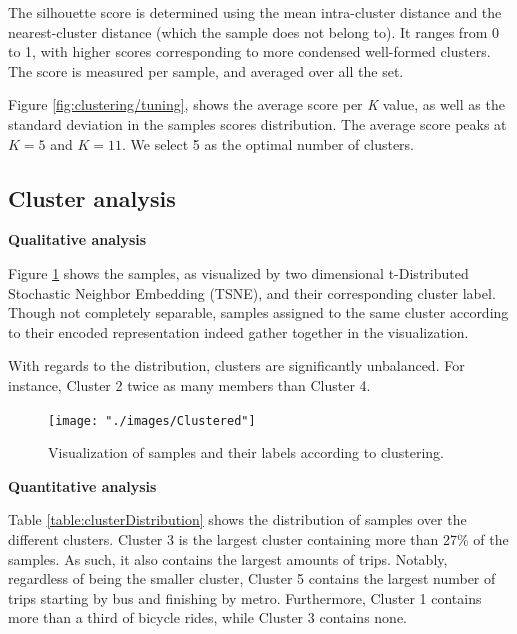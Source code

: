\documentclass{article}
\begin{document}
The silhouette score is determined using the mean intra-cluster distance and the nearest-cluster distance (which the sample does not belong to). It ranges from 0 to 1, with higher scores corresponding to more condensed well-formed clusters. The score is measured per sample, and averaged over all the set. 

Figure \ref{fig:clustering/tuning}, shows the average score per \textit{K} value, as well as the standard deviation in the samples scores distribution. The average score peaks at $\textit{K} = 5 $ and $\textit{K} = 11 $. We select 5 as the optimal number of clusters. 

\subsection{Cluster analysis}

\textbf{Qualitative analysis}


Figure \ref{fig:clustering/tsne} shows the samples, as visualized by two dimensional t-Distributed Stochastic Neighbor Embedding (TSNE), and their corresponding cluster label. Though not completely separable, samples assigned to the same cluster according to their encoded representation indeed gather together in the visualization. 

With regards to the distribution, clusters are significantly unbalanced. For instance, Cluster 2 twice as many members than Cluster 4.

\begin{figure}[H]
  \centering
  \texttt{[image: "./images/Clustered"]}
  \caption{Visualization of samples and their labels according to clustering.}
  \label{fig:clustering/tsne}
\end{figure}

\textbf{Quantitative analysis}


Table \ref{table:clusterDistribution} shows the distribution of samples over the different clusters. Cluster 3 is the largest cluster containing more than 27\% of the samples. As such, it also contains the largest amounts of trips. Notably, regardless of being the smaller cluster, Cluster 5 contains the largest number of trips starting by bus and finishing by metro. Furthermore, Cluster 1 contains more than a third of bicycle rides, while Cluster 3 contains none. 

\end{document}
